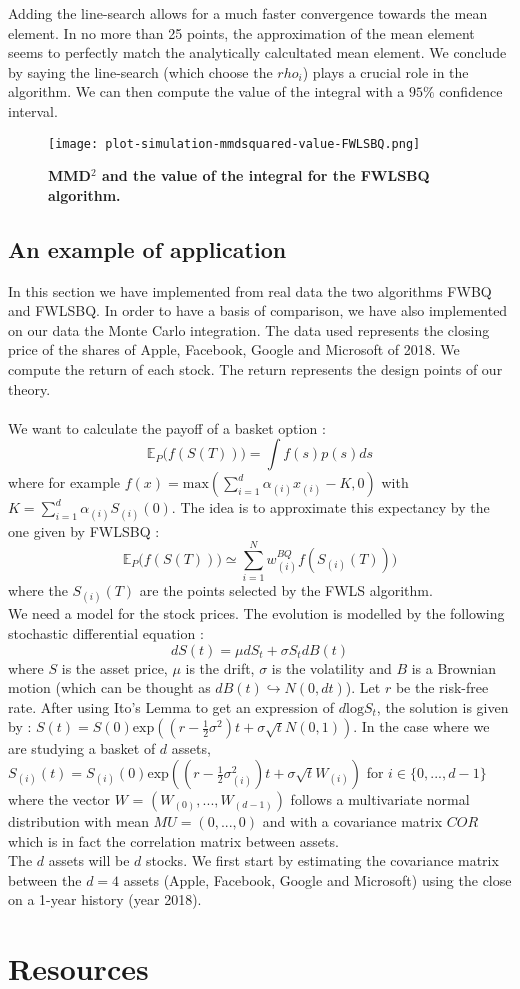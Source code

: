 Adding the line-search allows for a much faster convergence towards the mean element. In no more than 25 points, the approximation of the mean element seems to perfectly match the analytically calcultated mean element. We conclude by saying the line-search (which choose the $rho_{i}$) plays a crucial role in the algorithm.
We can then compute the value of the integral with a $95\%$ confidence interval.
\begin{figure}[H]
\begin{center}
	\texttt{[image: plot-simulation-mmdsquared-value-FWLSBQ.png]}
	\caption{\textbf{MMD$^2$ and the value of the integral for the FWLSBQ algorithm.}}
\end{center}
\end{figure}

\subsection{An example of application}
In this section we have implemented from real data the two algorithms FWBQ and FWLSBQ. In order to have a basis of comparison, we have also implemented on our data the Monte Carlo integration. The data used represents the closing price of the shares of Apple, Facebook, Google and Microsoft of 2018. We compute the return of each stock. The return represents the design points of our theory. \\ \\
We want to calculate the payoff of a basket option : $$ \mathbb{E}_P \Big( f(S(T)) \Big) = \int f(s) p(s) ds $$ where for example $f(x) = \text{max} ( \sum_{i = 1}^{d} \alpha_{(i)} x_{(i)} - K, 0) $ with $K = \sum_{i = 1}^{d} \alpha_{(i)} S_{(i)}(0) $. The idea is to approximate this expectancy by the one given by FWLSBQ : $$ \mathbb{E}_P \Big( f(S(T)) \Big) \simeq \sum_{i = 1}^{N} w_{(i)}^{BQ} f(S_{(i)}(T))) $$ where the $S_{(i)}(T)$ are the points selected by the FWLS algorithm. \\
We need a model for the stock prices. The evolution is modelled by the following stochastic differential equation : $$ dS(t) = \mu dS_t + \sigma S_t dB(t) $$ where $S$ is the asset price, $\mu$ is the drift, $\sigma$ is the volatility and $B$ is a Brownian motion (which can be thought as $dB(t) \hookrightarrow N(0, dt)$). Let $r$ be the risk-free rate. After using Ito's Lemma to get an expression of $d\text{log}S_t$, the solution is given by : $S(t) = S(0) \text{exp} ((r-\frac{1}{2}\sigma^2)t + \sigma \sqrt{t} N(0, 1) )$. In the case where we are studying a basket of $d$ assets, $S_{(i)}(t) = S_{(i)}(0) \text{exp} ((r-\frac{1}{2}\sigma_{(i)}^2)t + \sigma \sqrt{t} W_{(i)} )$ for $i \in \{0, ..., d-1\}$ where the vector $W$ = $(W_{(0)}, ..., W_{(d-1)})$ follows a multivariate normal distribution with mean $MU = (0, ..., 0)$ and with a covariance matrix $COR$ which is in fact the correlation matrix between assets. \\
The $d$ assets will be $d$ stocks. We first start by estimating the covariance matrix between the $d = 4$ assets (Apple, Facebook, Google and Microsoft) using the close on a 1-year history (year 2018).


\section*{Resources}
\label{sec:bibli}

\nocite{*}
\printbibliography[heading=none]
